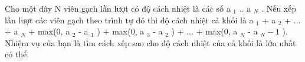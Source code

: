 Cho một dãy N viên gạch lần lượt có độ cách nhiệt là các số a   $_    1   $   .. a   $_    N   $   . Nếu xếp lần lượt các viên gạch theo trình tự đó thì độ cách nhiệt cả khối là a   $_    1   $   + a   $_    2   $   + ... + a   $_    N   $   + max(0, a   $_    2   $   - a   $_    1   $   ) + max(0, a   $_    3   $   - a   $_    2   $   ) + ... + max(0, a   $_    N   $   - a   $_    N - 1   $   ). Nhiệm vụ của bạn là tìm cách xếp sao cho độ cách nhiệt của cả khối là lớn nhất có thể.